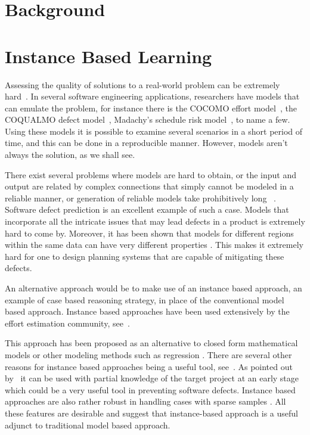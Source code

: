 \documentclass[conference]{IEEEtran}
\begin{document}
{\section{Background}
\section{Instance Based Learning}

Assessing the quality of solutions to a real-world problem can be extremely hard~\cite{menzies2005xomo}. In several software engineering applications, researchers have models that can emulate the problem, for instance there is the COCOMO effort model~\cite[p29-57]{boehm2009software}, the COQUALMO defect model~\cite[p254-268]{boehm2009software}, Madachy’s schedule risk model~\cite[p284-291]{boehm2009software}, to name a few. Using these models it is possible to examine several scenarios in a short period of time, and this can be done in a reproducible manner. However, models aren't always the solution, as we shall see. 

There exist several problems where models are hard to obtain, or the input and output are related by complex connections that simply cannot be modeled in a reliable manner, or generation of reliable models take prohibitively long ~\cite{Ludewig2003}. Software defect prediction is an excellent example of such a case. Models that incorporate all the intricate issues that may lead defects in a product is extremely hard to come by. Moreover, it has been shown that models for different regions within the same data can have very different properties \cite{localvsglobal}. This makes it extremely hard for one to design planning systems that are capable of mitigating these defects.

An alternative approach would be to make use of an instance based approach, an example of case based reasoning strategy, in place of the conventional model based approach. Instance based approaches have been used extensively by the effort estimation community, see~\cite{keung2008analogy, 6600685, walkerden1999empirical, shepperd1997estimating, kocaguneli2010use}. 

This approach has been proposed as an alternative to closed form mathematical models or other modeling methods such as regression \cite{keung2008analogy}. There are several other reasons for instance based approaches being a useful tool, see~\cite{6600685}. As pointed out by~\cite{walkerden1999empirical} it can be used with partial knowledge of the target project at an early stage which could be a very useful tool in preventing software defects. Instance based approaches are also rather robust in handling cases with sparse samples \cite{1438374}. All these features are desirable and suggest that instance-based approach is a useful adjunct to traditional model based approach. 

}
\end{document}
